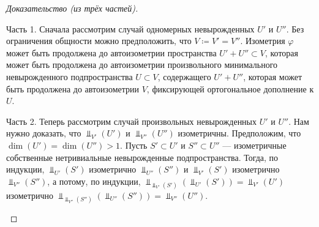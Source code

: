 \documentclass[
	extrafontsizes,
	11pt,
	hyphens,
]{memoir}
\begin{document}
\begin{proof}[Доказательство (из трёх частей)]
~\begin{proofdescription}

\item[Часть 1.]
Сначала
рассмотрим случай одномерных не\-вы\-рож\-ден\-ных \(U'\) и \(U''\).
Без ограничения общности можно предположить, что \(V \coloneqq V' = V''\).
Изометрия \(\varphi\) может быть продолжена до автоизометрии пространства \(U' + U'' \subset V\), которая может быть продолжена до автоизометрии произвольного минимального невырожденного подпространства \(U \subset V\), содержащего \(U' + U''\), которая может быть продолжена до автоизометрии \(V\), фиксирующей ортогональное дополнение к \(U\).

\item[Часть 2.]
Теперь рассмотрим случай произвольных невырожденных \(U'\) и \(U''\).
Нам нужно доказать, что \(\Perp_{V'}(U')\) и \(\Perp_{V''}(U'')\) изометричны.
Предположим, что \(\dim(U') = \dim(U'') > 1\).
Пусть \(S' \subset U'\) и \(S'' \subset U''\) --- изометричные собственные нетривиальные невырожденные подпространства.
Тогда, по индукции, \(\Perp_{U'}(S')\) изометрично \(\Perp_{U''}(S'')\) и \(\Perp_{V'}(S')\) изометрично \(\Perp_{V''}(S'')\),
а потому, по индукции, \(\Perp_{\Perp_{V'}(S')}(\Perp_{U'}(S')) = \Perp_{V'}(U')\) изометрично \(\Perp_{\Perp_{V''}(S'')}(\Perp_{U''}(S'')) = \Perp_{V''}(U'')\).


\end{proofdescription}
\end{proof}
\end{document}
